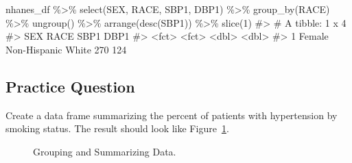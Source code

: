 \documentclass[
  letterpaper,
]{latex/krantz}
\makeatletter
\newenvironment{Shaded}{\begin{snugshade}}{\end{snugshade}}
\newcommand{\CommentTok}[1]{\textcolor[rgb]{0.37,0.37,0.37}{#1}}
\newcommand{\DecValTok}[1]{\textcolor[rgb]{0.68,0.00,0.00}{#1}}
\newcommand{\FunctionTok}[1]{\textcolor[rgb]{0.28,0.35,0.67}{#1}}
\newcommand{\NormalTok}[1]{\textcolor[rgb]{0.00,0.23,0.31}{#1}}
\newcommand{\SpecialCharTok}[1]{\textcolor[rgb]{0.37,0.37,0.37}{#1}}
\newenvironment{kframe}{%
\medskip{}
\setlength{\fboxsep}{.8em}
 \def\at@end@of@kframe{}%
 \ifinner\ifhmode%
  \def\at@end@of@kframe{\end{minipage}}%
  \begin{minipage}{\columnwidth}%
 \fi\fi%
 \def\FrameCommand##1{\hskip\@totalleftmargin \hskip-\fboxsep
 \colorbox{shadecolor}{##1}\hskip-\fboxsep
     \hskip-\linewidth \hskip-\@totalleftmargin \hskip\columnwidth}%
 \MakeFramed {\advance\hsize-\width
   \@totalleftmargin\z@ \linewidth\hsize
   \@setminipage}}%
 {\par\unskip\endMakeFramed%
 \at@end@of@kframe}
\renewenvironment{Shaded}{\begin{kframe}}{\end{kframe}}
\makeatother
\begin{document}
\begin{Shaded}
\begin{Highlighting}[]
\NormalTok{nhanes\_df }\SpecialCharTok{\%\textgreater{}\%} 
  \FunctionTok{select}\NormalTok{(SEX, RACE, SBP1, DBP1) }\SpecialCharTok{\%\textgreater{}\%}
  \FunctionTok{group\_by}\NormalTok{(RACE) }\SpecialCharTok{\%\textgreater{}\%}
  \FunctionTok{ungroup}\NormalTok{() }\SpecialCharTok{\%\textgreater{}\%}
  \FunctionTok{arrange}\NormalTok{(}\FunctionTok{desc}\NormalTok{(SBP1)) }\SpecialCharTok{\%\textgreater{}\%}
  \FunctionTok{slice}\NormalTok{(}\DecValTok{1}\NormalTok{)}
\CommentTok{\#\textgreater{} \# A tibble: 1 x 4}
\CommentTok{\#\textgreater{}   SEX    RACE                SBP1  DBP1}
\CommentTok{\#\textgreater{}   \textless{}fct\textgreater{}  \textless{}fct\textgreater{}              \textless{}dbl\textgreater{} \textless{}dbl\textgreater{}}
\CommentTok{\#\textgreater{} 1 Female Non{-}Hispanic White   270   124}
\end{Highlighting}
\end{Shaded}

\subsection{Practice Question}\label{practice-question-10}

Create a data frame summarizing the percent of patients with
hypertension by smoking status. The result should look like
Figure~\ref{fig-grouping-and-summarizing}.

\begin{figure}


\caption{\label{fig-grouping-and-summarizing}Grouping and Summarizing
Data.}

\end{figure}%
\end{document}
